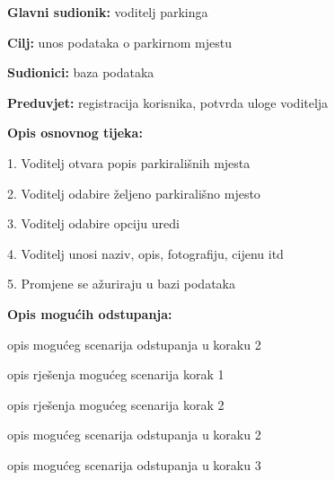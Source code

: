 					\noindent {}
					\begin{packed_item}
						\item \textbf{Glavni sudionik: }voditelj parkinga
						\item  \textbf{Cilj:} unos podataka o parkirnom mjestu
						\item  \textbf{Sudionici:} baza podataka
						\item  \textbf{Preduvjet:} registracija korisnika, potvrda uloge voditelja
						\item  \textbf{Opis osnovnog tijeka:}
						
						\item[] \begin{packed_enum}
							
							\item 1. Voditelj otvara popis parkirališnih mjesta
							\item 2. Voditelj odabire željeno parkirališno mjesto
							\item 3. Voditelj odabire opciju uredi
							\item 4. Voditelj unosi naziv, opis, fotografiju, cijenu itd
							\item 5. Promjene se ažuriraju u bazi podataka
						\end{packed_enum}
						
						\item  \textbf{Opis mogućih odstupanja:}
						
						\item[] \begin{packed_item}
							
							\item[2.a] opis mogućeg scenarija odstupanja u koraku 2
							\item[] \begin{packed_enum}
								
								\item opis rješenja mogućeg scenarija korak 1
								\item opis rješenja mogućeg scenarija korak 2
								
							\end{packed_enum}
							\item[2.b] opis mogućeg scenarija odstupanja u koraku 2
							\item[3.a] opis mogućeg scenarija odstupanja  u koraku 3
							
						\end{packed_item}
					\end{packed_item}
					
